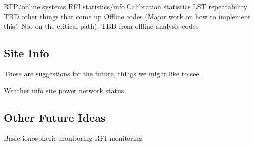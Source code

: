 \documentclass{article}
\begin{document}
\begin{outline}[enumerate]
	\1 RTP/online systems
		\2 RFI statistics/info
		\2 Calibration statistics
		\2 LST repeatability
		\2 TBD other things that come up
	\1 Offline codes (Major work on how to implement this!! Not on the critical path):
		\2 TBD from offline analysis codes
\end{outline}

\subsection{Site Info}
These are suggestions for the future, things we might like to see.
\begin{outline}[enumerate]
	\1 Weather info
	\1 site power
	\1 network status
\end{outline}

\subsection{Other Future Ideas}
\begin{outline}[enumerate]
	\1 Basic ionospheric monitoring
	\1 RFI monitoring
\end{outline}
\end{document}
